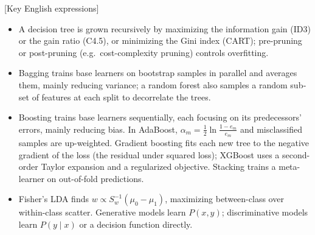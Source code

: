 \begin{english}[Key English expressions]
\begin{itemize}
\item A decision tree is grown recursively by maximizing the information gain (ID3) or the gain ratio (C4.5), or minimizing the Gini index (CART); pre-pruning or post-pruning (e.g.\ cost-complexity pruning) controls overfitting.
\item Bagging trains base learners on bootstrap samples in parallel and averages them, mainly reducing variance; a random forest also samples a random subset of features at each split to decorrelate the trees.
\item Boosting trains base learners sequentially, each focusing on its predecessors' errors, mainly reducing bias. In AdaBoost, $\alpha_m=\frac12\ln\frac{1-e_m}{e_m}$ and misclassified samples are up-weighted. Gradient boosting fits each new tree to the negative gradient of the loss (the residual under squared loss); XGBoost uses a second-order Taylor expansion and a regularized objective. Stacking trains a meta-learner on out-of-fold predictions.
\item Fisher's LDA finds $w\propto S_w^{-1}(\mu_0-\mu_1)$, maximizing between-class over within-class scatter. Generative models learn $P(x,y)$; discriminative models learn $P(y\mid x)$ or a decision function directly.
\end{itemize}
\end{english}
\renewcommand{\arraystretch}{1.25}

